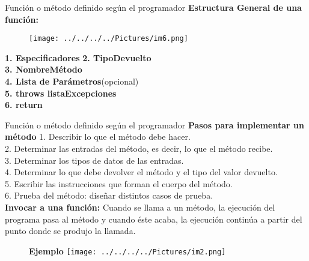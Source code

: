 \documentclass[11pt]{beamer}
\begin{document}
\begin{frame}{Función o método definido según el programador}
			\justifying
\textbf{Estructura General de una función:}
\begin{figure}[hbtp]
		\centering
		\texttt{[image: ../../../../Pictures/im6.png]}
		\end{figure}
	\textbf{1. Especificadores}
	\vfill\textbf{2. TipoDevuelto}\\
	\vfill\textbf{3. NombreMétodo}\\
	\vfill\textbf{4. Lista de Parámetros}(opcional)\\
	\vfill\textbf{5. throws listaExcepciones}\\
	\vfill\textbf{6. return}\\
\end{frame}
\begin{frame}{Función o método definido según el programador}
			\justifying
\textbf{Pasos para implementar un método} 
\vfill
1.     Describir lo que el método debe hacer.\\
\vfill
2.     Determinar las entradas del método, es decir, lo que el método recibe.\\
\vfill
3.     Determinar los tipos de datos de las entradas.\\
\vfill
4.     Determinar lo que debe devolver el método y el tipo del valor devuelto.\\
\vfill
5.     Escribir las instrucciones que forman el cuerpo del método.\\
\vfill
6.     Prueba del método: diseñar distintos casos de prueba.\\
\vfill
\textbf{Invocar a una función:} Cuando se llama a un método, la ejecución del programa pasa al método y cuando éste acaba, la ejecución continúa a partir del punto donde se produjo la llamada.\\
\begin{figure}[hbtp]
		\centering
		\textbf{Ejemplo}
		\texttt{[image: ../../../../Pictures/im2.png]}
		\end{figure}
\end{frame}
\end{document}
